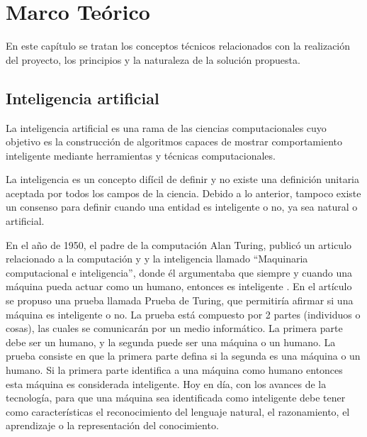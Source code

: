 \documentclass[twoside,spanish,ESP,MSc]{plantillaLabUPV}
\theoremstyle{definition}
\begin{document}


\chapter{Marco Teórico} \label{chap:marcoteori} 

En este capítulo se tratan los conceptos técnicos relacionados con la realización del proyecto, los principios y la naturaleza de la solución propuesta.




\section{Inteligencia artificial}

La inteligencia artificial es una rama de las ciencias computacionales cuyo objetivo es la construcción de algoritmos capaces de mostrar comportamiento inteligente mediante herramientas y técnicas computacionales.


La inteligencia es un concepto difícil de definir y no existe una definición unitaria aceptada por todos los campos de la ciencia. Debido a lo anterior, tampoco existe un consenso para definir cuando una entidad es inteligente o no, ya sea natural o artificial.

En el año de 1950, el padre de la computación Alan Turing, publicó un articulo relacionado a la computación y y la inteligencia llamado ``Maquinaria computacional e inteligencia'', donde él argumentaba que siempre y cuando una máquina pueda actuar como un humano, entonces es inteligente \cite{iabook}. En el artículo se propuso una prueba llamada Prueba de Turing, que permitiría afirmar si una máquina es inteligente o no. La prueba está compuesto por 2 partes (individuos o cosas), las cuales se comunicarán por un medio informático. La primera parte debe ser un humano, y la segunda puede ser una máquina o un humano. La prueba consiste en que la primera parte defina si la segunda es una máquina o un humano. Si la primera parte identifica a una máquina como humano entonces esta máquina es considerada inteligente. Hoy en día, con los avances de la tecnología, para que una máquina sea identificada como inteligente debe tener como características el reconocimiento del lenguaje natural, el razonamiento, el aprendizaje o la representación del conocimiento.
\end{document}
